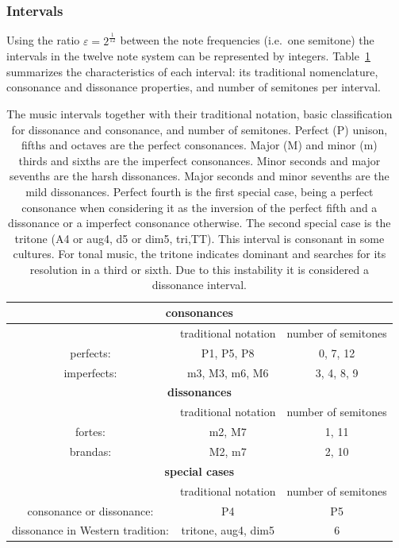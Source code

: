 \documentclass[
 aip,
 jmp,
 amsmath,amssymb,
 reprint,
]{revtex4-1}
\begin{document}
\subsubsection{Intervals}\label{subsec:intervalos}

Using the ratio $\varepsilon=2^{\frac{1}{12}}$ between the note frequencies
(i.e.\ one semitone) the intervals in the twelve note system can be represented by integers. Table~\ref{eq:intervalos} summarizes the characteristics of each interval: its traditional nomenclature, consonance and
dissonance properties, and number of semitones per interval.

\begin{table}[htpq!]
\centering
\caption{The music intervals together with their traditional notation, basic classification for dissonance and consonance, and number of semitones. Perfect (P) unison, fifths and octaves are the perfect consonances. Major (M) and minor (m) thirds and sixths are the imperfect consonances. Minor seconds and major sevenths are the harsh dissonances. Major seconds and minor sevenths are the mild dissonances. Perfect fourth is the first special case, being a perfect consonance when considering it as the inversion of the perfect fifth and a dissonance or a imperfect consonance otherwise. The second special case is the tritone (A4 or aug4, d5 or dim5, tri,TT). This interval is consonant in some cultures. For tonal music, the tritone indicates dominant and searches for its resolution in a third or sixth. Due to this instability it is considered a dissonance interval.}
\begin{tabular}{| c | c | c | }\hline
    \multicolumn{3}{|c|}{\bf consonances}  \\\hline
   & traditional notation & number of semitones \\
   perfects: & P1, P5, P8 & 0, 7, 12 \\
 imperfects: & m3, M3, m6, M6 & 3, 4, 8, 9 \\\hline\hline
    \multicolumn{3}{|c|}{\bf dissonances} \\\hline
 & traditional notation & number of semitones \\
 fortes: & m2, M7 & 1, 11 \\
 brandas: & M2, m7 & 2, 10 \\\hline\hline
    \multicolumn{3}{|c|}{\bf special cases} \\\hline
 & traditional notation & number of semitones \\
 consonance or dissonance: & P4 & P5 \\
 dissonance in Western tradition: & tritone, aug4, dim5 & 6 \\\hline
\end{tabular}\label{eq:intervalos}
\end{table}
\end{document}
